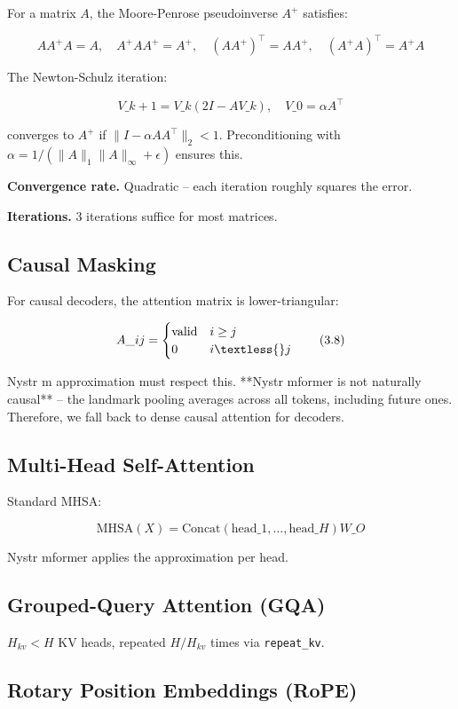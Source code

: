 For a matrix $A$, the Moore-Penrose pseudoinverse $A^+$ satisfies:

\[
A A^+ A = A, \quad A^+ A A^+ = A^+, \quad (A A^+)^\top = A A^+, \quad (A^+ A)^\top = A^+ A
\tag{3.6}
\]

The Newton-Schulz iteration:

\[
V\_{k+1} = V\_k (2 I - A V\_k), \quad V\_0 = \alpha A^\top
\tag{3.7}
\]

converges to $A^+$ if $\|I - \alpha A A^\top\|_2 < 1$. Preconditioning 
with $\alpha = 1 / (\|A\|_1 \|A\|_\infty + \epsilon)$ ensures this.

\textbf{Convergence rate.} Quadratic -- each iteration roughly squares the error.

\textbf{Iterations.} 3 iterations suffice for most matrices.

\subsection{Causal Masking}

For causal decoders, the attention matrix is lower-triangular:

\[
A\_{ij} = \begin{cases} \text{valid} & i \geq j \\ 0 & i \textless{} j \end{cases}
\tag{3.8}
\]

Nystr m approximation must respect this. **Nystr mformer is not naturally 
causal** -- the landmark pooling averages across all tokens, including 
future ones. Therefore, we fall back to dense causal attention for decoders.

\subsection{Multi-Head Self-Attention}

Standard MHSA:

\[
\text{MHSA}(X) = \mathrm{Concat}(\text{head}\_1, \dots, \text{head}\_H) W\_O
\tag{3.9}
\]

Nystr mformer applies the approximation per head.

\subsection{Grouped-Query Attention (GQA)}

$H_{kv} < H$ KV heads, repeated $H / H_{kv}$ times via \texttt{repeat\_kv}.

\subsection{Rotary Position Embeddings (RoPE)}

